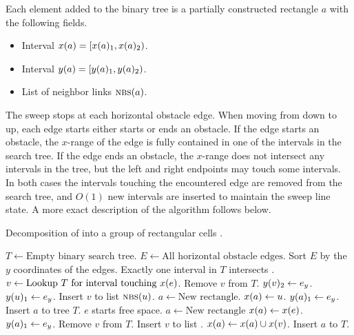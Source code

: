 \documentclass[english,gradu]{tktltiki2018}
\begin{document}
Each element added to the binary tree is a partially constructed rectangle $a$ with the following fields.
\begin{itemize}
\item Interval $x(a)=\left [ x(a)_{1} , x(a)_{2} \right )$.
\item Interval $y(a)=\left [ y(a)_{1} , y(a)_{2} \right )$.
\item List of neighbor links $\textsc{nbs}{(a)}$.
\end{itemize}

The sweep stops at each horizontal obstacle edge.
When moving from down to up, each edge starts either starts or ends an obstacle.
If the edge starts an obstacle, the $x$-range of the edge is fully contained in one of the intervals in the search tree.
If the edge ends an obstacle, the $x$-range does not intersect any intervals in the tree, but the left and right endpoints may touch some intervals.
In both cases the intervals touching the encountered edge are removed from the search tree, and $O(1)$ new intervals are inserted to maintain the sweep line state.
A more exact description of the algorithm follows below.

\begin{alg}\label{alg:split2d}
Decomposition of \fspace into a group of rectangular cells .
\begin{algorithmic}
\State $T\gets \text{Empty binary search tree}$.
\State $E\gets\text{All horizontal obstacle edges}$.
\State Sort $E$ by the $y$ coordinates of the edges.
		\Comment Exactly one interval in $T$ intersects .
		\State $v\gets\text{Lookup $T$ for interval touching \ensuremath{x(e)}}$.
		\State Remove $v$ from $T$.
		\State $y(v)_{2}\gets{e}_y$.
			\State $y(u)_{1}\gets{e}_y$.
			\State Insert $v$ to list $\textsc{nbs}{(u)}$.
			\State $a\gets\text{New rectangle}$.
			\State $x(a)\gets u$.
			\State $y(a)_{1}\gets{e}_y$.
			\State Insert $a$ to tree $T$.
		\EndFor
	\Else\Comment $e$ starts free space.
		\State $a\gets\text{New rectangle}$
		\State $x(a)\gets x(e)$.
		\State $y(a)_{1}\gets{e}_y$.
			\State Remove $v$ from $T$.
			\State Insert $v$ to list .
			\State $x(a)\gets x(a)\cup x(v)$.
		\EndFor
		\State Insert $a$ to $T$.
	\EndIf
\EndFor
\end{algorithmic}
\end{alg}
\end{document}
